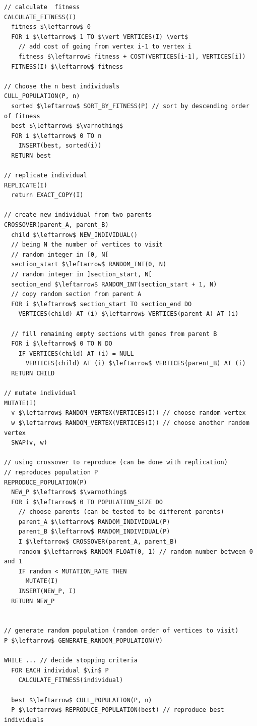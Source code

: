 \documentclass[article, a4paper, 12pt, oneside]{memoir}
\begin{document}
\begin{lstlisting}[frame=single, mathescape=true]
// calculate  fitness
CALCULATE_FITNESS(I)
  fitness $\leftarrow$ 0
  FOR i $\leftarrow$ 1 TO $\vert VERTICES(I) \vert$
    // add cost of going from vertex i-1 to vertex i
    fitness $\leftarrow$ fitness + COST(VERTICES[i-1], VERTICES[i])
  FITNESS(I) $\leftarrow$ fitness

// Choose the n best individuals
CULL_POPULATION(P, n)
  sorted $\leftarrow$ SORT_BY_FITNESS(P) // sort by descending order of fitness
  best $\leftarrow$ $\varnothing$
  FOR i $\leftarrow$ 0 TO n
    INSERT(best, sorted(i))
  RETURN best

// replicate individual
REPLICATE(I)
  return EXACT_COPY(I)
  
// create new individual from two parents
CROSSOVER(parent_A, parent_B)
  child $\leftarrow$ NEW_INDIVIDUAL()
  // being N the number of vertices to visit
  // random integer in [0, N[
  section_start $\leftarrow$ RANDOM_INT(0, N)
  // random integer in ]section_start, N[
  section_end $\leftarrow$ RANDOM_INT(section_start + 1, N)
  // copy random section from parent A
  FOR i $\leftarrow$ section_start TO section_end DO
    VERTICES(child) AT (i) $\leftarrow$ VERTICES(parent_A) AT (i)
  
  // fill remaining empty sections with genes from parent B
  FOR i $\leftarrow$ 0 TO N DO
    IF VERTICES(child) AT (i) = NULL
      VERTICES(child) AT (i) $\leftarrow$ VERTICES(parent_B) AT (i)
  RETURN CHILD

// mutate individual
MUTATE(I)
  v $\leftarrow$ RANDOM_VERTEX(VERTICES(I)) // choose random vertex
  w $\leftarrow$ RANDOM_VERTEX(VERTICES(I)) // choose another random vertex
  SWAP(v, w)

// using crossover to reproduce (can be done with replication)
// reproduces population P
REPRODUCE_POPULATION(P)
  NEW_P $\leftarrow$ $\varnothing$
  FOR i $\leftarrow$ 0 TO POPULATION_SIZE DO
    // choose parents (can be tested to be different parents)
    parent_A $\leftarrow$ RANDOM_INDIVIDUAL(P)
    parent_B $\leftarrow$ RANDOM_INDIVIDUAL(P)
    I $\leftarrow$ CROSSOVER(parent_A, parent_B)
    random $\leftarrow$ RANDOM_FLOAT(0, 1) // random number between 0 and 1
    IF random < MUTATION_RATE THEN
      MUTATE(I)
    INSERT(NEW_P, I)
  RETURN NEW_P
  

// generate random population (random order of vertices to visit)
P $\leftarrow$ GENERATE_RANDOM_POPULATION(V)

WHILE ... // decide stopping criteria
  FOR EACH individual $\in$ P
    CALCULATE_FITNESS(individual)
  
  best $\leftarrow$ CULL_POPULATION(P, n)
  P $\leftarrow$ REPRODUCE_POPULATION(best) // reproduce best individuals
\end{lstlisting}
\end{document}
